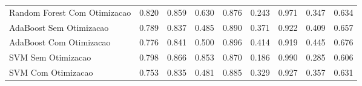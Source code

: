 \begin{table}[H]
\begin{adjustwidth}{ -1in }{ -1in }
\begin{tabular}{lrrrrrrrr}
      Random Forest Com Otimizacao &                        0.820 &                         0.859 &                            0.630 &                            0.876 &                          0.243 &                          0.971 &                                     0.347 &                                 0.634 \\
           AdaBoost Sem Otimizacao &                        0.789 &                         0.837 &                            0.485 &                            0.890 &                          0.371 &                          0.922 &                                     0.409 &                                 0.657 \\
           AdaBoost Com Otimizacao &                        0.776 &                         0.841 &                            0.500 &                            0.896 &                          0.414 &                          0.919 &                                     0.445 &                                 0.676 \\
                SVM Sem Otimizacao &                        0.798 &                         0.866 &                            0.853 &                            0.870 &                          0.186 &                          0.990 &                                     0.285 &                                 0.606 \\
                SVM Com Otimizacao &                        0.753 &                         0.835 &                            0.481 &                            0.885 &                          0.329 &                          0.927 &                                     0.357 &                                 0.631 \\
\bottomrule
\end{tabular}
    \end{adjustwidth}
    \renewcommand{\arraystretch}{1.0} %
\end{table}
